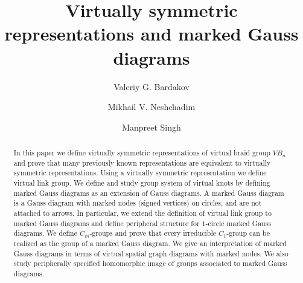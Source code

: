 \documentclass[11 pt, reqno]{amsart}
\theoremstyle{definition}
\numberwithin{equation}{subsection}
\begin{document}
\title{Virtually symmetric representations and marked Gauss diagrams}


\author{Valeriy G. Bardakov}
\address{Sobolev Institute of Mathematics, 4 Acad. Koptyug avenue, 630090, Novosibirsk, Russia.}
\address{Novosibirsk State  University, 2 Pirogova Street, 630090, Novosibirsk, Russia.}
\address{Novosibirsk State Agrarian University, Dobrolyubova street, 160, Novosibirsk, 630039, Russia.}
\address{Regional Scientific and Educational Mathematical Center of Tomsk State University, 36 Lenin Ave., Tomsk, Russia.}

\author{Mikhail V. Neshchadim}
\address{Sobolev Institute of Mathematics, 4 Acad. Koptyug avenue, 630090, Novosibirsk, Russia.}
\address{Novosibirsk State  University, 2 Pirogova Street, 630090, Novosibirsk, Russia.}
\address{Regional Scientific and Educational Mathematical Center of Tomsk State University, 36 Lenin Ave., Tomsk, Russia}

\author{Manpreet Singh}
\address{Department of Mathematical Sciences, Indian Institute of Science Education and Research (IISER) Mohali, Sector 81,  S. A. S. Nagar, P. O. Manauli, Punjab 140306, India.}



\begin{abstract}
In this paper we define virtually symmetric representations of virtual braid group $VB_n$ and prove that many previously known representations are equivalent to virtually symmetric representations. Using a virtually symmetric representation we define virtual link group. We define and study group system of virtual knots by defining marked Gauss diagrams as an extension of Gauss diagrams. A marked Gauss diagram is a Gauss diagram with marked nodes $($signed vertices$)$ on circles, and are not attached to arrows. In particular, we extend the definition of virtual link group to marked Gauss diagrams and define peripheral structure for $1$-circle marked Gauss diagrams. We define $C_m$-groups and prove that every irreducible $C_1$-group can be realized as the group of a marked Gauss diagram. We give an interpretation of marked Gauss diagrams in terms of virtual spatial graph diagrams with marked nodes. We also study peripherally specified homomorphic image of groups associated to marked Gauss diagrams.
\end{abstract}
\maketitle
\end{document}
